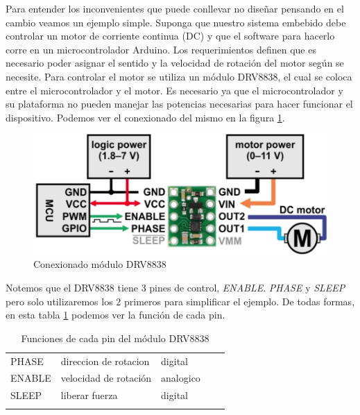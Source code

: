 Para entender los inconvenientes que puede conllevar no diseñar pensando en el cambio veamos un ejemplo simple. Suponga que nuestro sistema embebido debe controlar un motor de corriente continua (\gls{DC}) y que el software para hacerlo corre en un microcontrolador Arduino. Los requerimientos definen que es necesario poder asignar el sentido y la velocidad de rotación del motor según se necesite. Para controlar el motor se utiliza un módulo \gls{DRV8838}, el cual se coloca entre el microcontrolador y el motor. Es necesario ya que el microcontrolador y su plataforma no pueden manejar las potencias necesarias para hacer funcionar el dispositivo. Podemos ver el conexionado del mismo en la figura \ref{drv8838}.

\begin{figure}[h]
    \centering
    \includegraphics[width=0.65\linewidth]{drv8838.png}
    \caption{Conexionado módulo DRV8838}
    \label{drv8838}
\end{figure}

Notemos que el \gls{DRV8838} tiene 3 pines de control, \textit{ENABLE}. \textit{PHASE} y \textit{SLEEP} pero solo utilizaremos los 2 primeros para simplificar el ejemplo. De todas formas, en esta tabla \ref{funciones_pin_drv8838} podemos ver la función de cada pin.


\begin{table}[h]
\centering
\begin{tabular}{lllll}
\cline{1-3}
\multicolumn{1}{|l|}{PHASE}  & \multicolumn{1}{l|}{direccion de rotacion} & \multicolumn{1}{l|}{digital}   &  &  \\ \cline{1-3}
\multicolumn{1}{|l|}{ENABLE} & \multicolumn{1}{l|}{velocidad de rotación} & \multicolumn{1}{l|}{analogico} &  &  \\ \cline{1-3}
\multicolumn{1}{|l|}{SLEEP}  & \multicolumn{1}{l|}{liberar fuerza}        & \multicolumn{1}{l|}{digital}   &  &  \\ \cline{1-3}
                             &                                            &                                &  & 
\end{tabular}
\caption{Funciones de cada pin del módulo DRV8838}
\label{funciones_pin_drv8838}
\end{table}

